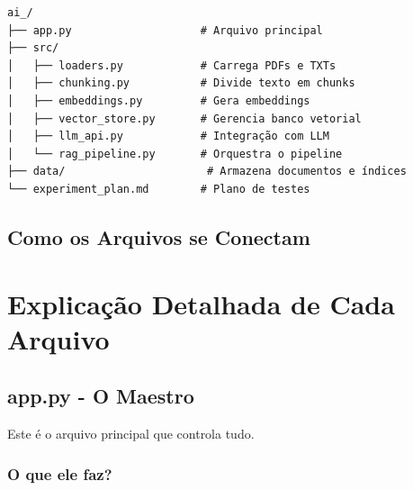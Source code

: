 \documentclass[12pt,a4paper]{article}
\begin{document}
\begin{lstlisting}
ai_/
├── app.py                    # Arquivo principal
├── src/
│   ├── loaders.py            # Carrega PDFs e TXTs
│   ├── chunking.py           # Divide texto em chunks
│   ├── embeddings.py         # Gera embeddings
│   ├── vector_store.py       # Gerencia banco vetorial
│   ├── llm_api.py            # Integração com LLM
│   └── rag_pipeline.py       # Orquestra o pipeline
├── data/                      # Armazena documentos e índices
└── experiment_plan.md        # Plano de testes
\end{lstlisting}

\subsection{Como os Arquivos se Conectam}


\section{Explicação Detalhada de Cada Arquivo}

\subsection{app.py - O Maestro}

Este é o arquivo principal que controla tudo.

\subsubsection{O que ele faz?}
\end{document}
